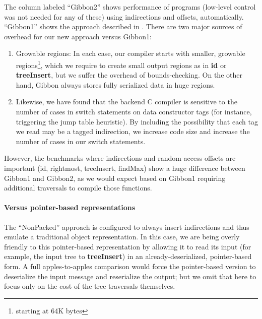 \documentclass[showabstract,showacknowledgments,showpreface,showdedication]{iuphd}
\theoremstyle{nonumberplain}
\begin{document}
The column labeled ``Gibbon2'' shows performance of \lamadt programs
(low-level \ourcalc control was not needed for any of these)
using indirections and offsets, automatically.
%
``Gibbon1'' shows the approach described in \cite{ecoop17-gibbon}.
%
There are two major sources of overhead for our new approach versus Gibbon1:
 
\begin{enumerate}
\item Growable regions:
In each case, our compiler starts with smaller, growable regions\footnote{starting at 64K bytes}, 
which we require to create small output regions as
in {\bf id} or {\bf treeInsert},
but we suffer the overhead of bounds-checking. On the other hand,
Gibbon always stores fully serialized data in huge regions.

\item Likewise, we have found that the backend C compiler is sensitive to the number
of cases in switch statements on data constructor tags (for instance, triggering
the jump table heuristic).  By including the possibility that each tag we read
may be a tagged indirection,
we increase
code size and increase the number of cases in our switch statements.
\end{enumerate}


However, the benchmarks where indirections and random-access offsets are important (id,
rightmost, treeInsert, findMax) show a huge difference between Gibbon1 and Gibbon2,
as we would expect based on Gibbon1
requiring additional traversals to compile those functions.

\paragraph{Versus pointer-based representations}
The ``NonPacked'' approach is \ourcalc configured to always insert indirections
and thus emulate a traditional object representation.
%
In this case, we are being overly friendly to this pointer-based representation by
allowing it to read its input (for example, the input tree to {\bf treeInsert})
in an already-deserialized, pointer-based form.  A full apples-to-apples
comparison would force the pointer-based version to deserialize the input
message and reserialize the output; but we omit that here to focus only on the
cost of the tree traversals themselves.
%
\end{document}
